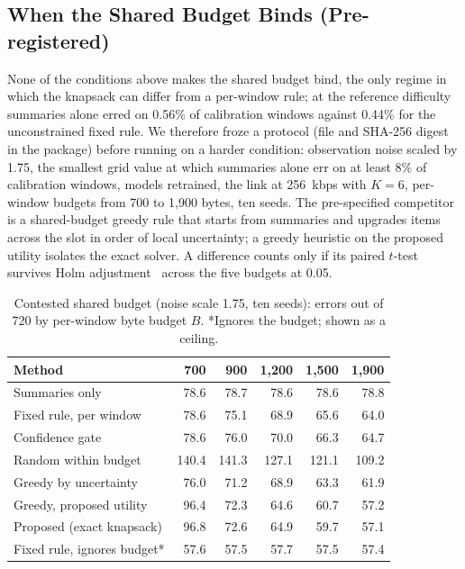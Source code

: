 \documentclass[conference,a4paper]{IEEEtran}
\newif\ifsubmission
\newcommand{\masteronly}[1]{\ifsubmission\else#1\fi}
\begin{document}
\subsection{When the Shared Budget Binds (Pre-registered)}
\label{sec:contested}
None of the conditions above makes the shared budget bind, the only regime in which the knapsack can differ from a per-window rule; at the reference difficulty summaries alone erred on 0.56\% of calibration windows against 0.44\% for the unconstrained fixed rule. We therefore froze a protocol (file and SHA-256 digest in the package) before running on a harder condition: observation noise scaled by 1.75, the smallest grid value at which summaries alone err on at least 8\% of calibration windows, models retrained, the link at 256~kbps with $K=6$, per-window budgets from 700 to 1,900 bytes, ten seeds. The pre-specified competitor is a shared-budget greedy rule that starts from summaries and upgrades items across the slot in order of local uncertainty; a greedy heuristic on the proposed utility isolates the exact solver. A difference counts only if its paired $t$-test survives Holm adjustment~\cite{holm} across the five budgets at 0.05.

\masteronly{%
\begin{table}[t]
\caption{Contested shared budget (noise scale 1.75, ten seeds): errors out of 720 by per-window byte budget $B$. *Ignores the budget; shown as a ceiling.}
\label{tab:contested}
\centering\scriptsize\setlength{\tabcolsep}{3pt}
\begin{tabular}{@{}p{2.3cm}rrrrr@{}}
\toprule
Method & 700 & 900 & 1,200 & 1,500 & 1,900 \\
\midrule
Summaries only & 78.6 & 78.7 & 78.6 & 78.6 & 78.8 \\
Fixed rule, per window & 78.6 & 75.1 & 68.9 & 65.6 & 64.0 \\
Confidence gate & 78.6 & 76.0 & 70.0 & 66.3 & 64.7 \\
Random within budget & 140.4 & 141.3 & 127.1 & 121.1 & 109.2 \\
Greedy by uncertainty & 76.0 & 71.2 & 68.9 & 63.3 & 61.9 \\
Greedy, proposed utility & 96.4 & 72.3 & 64.6 & 60.7 & 57.2 \\
Proposed (exact knapsack) & 96.8 & 72.6 & 64.9 & 59.7 & 57.1 \\
Fixed rule, ignores budget* & 57.6 & 57.5 & 57.7 & 57.5 & 57.4 \\
\bottomrule
\end{tabular}
\end{table}}%
\end{document}
